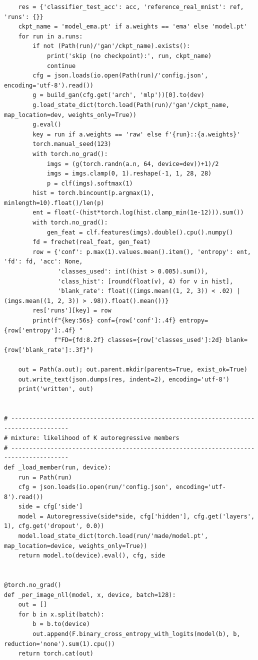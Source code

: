 \begin{lstlisting}
    res = {'classifier_test_acc': acc, 'reference_real_mnist': ref, 'runs': {}}
    ckpt_name = 'model_ema.pt' if a.weights == 'ema' else 'model.pt'
    for run in a.runs:
        if not (Path(run)/'gan'/ckpt_name).exists():
            print('skip (no checkpoint):', run, ckpt_name)
            continue
        cfg = json.loads(io.open(Path(run)/'config.json', encoding='utf-8').read())
        g = build_gan(cfg.get('arch', 'mlp'))[0].to(dev)
        g.load_state_dict(torch.load(Path(run)/'gan'/ckpt_name, map_location=dev, weights_only=True))
        g.eval()
        key = run if a.weights == 'raw' else f'{run}::{a.weights}'
        torch.manual_seed(123)
        with torch.no_grad():
            imgs = (g(torch.randn(a.n, 64, device=dev))+1)/2
            imgs = imgs.clamp(0, 1).reshape(-1, 1, 28, 28)
            p = clf(imgs).softmax(1)
        hist = torch.bincount(p.argmax(1), minlength=10).float()/len(p)
        ent = float(-(hist*torch.log(hist.clamp_min(1e-12))).sum())
        with torch.no_grad():
            gen_feat = clf.features(imgs).double().cpu().numpy()
        fd = frechet(real_feat, gen_feat)
        row = {'conf': p.max(1).values.mean().item(), 'entropy': ent, 'fd': fd, 'acc': None,
               'classes_used': int((hist > 0.005).sum()),
               'class_hist': [round(float(v), 4) for v in hist],
               'blank_rate': float(((imgs.mean((1, 2, 3)) < .02) | (imgs.mean((1, 2, 3)) > .98)).float().mean())}
        res['runs'][key] = row
        print(f"{key:56s} conf={row['conf']:.4f} entropy={row['entropy']:.4f} "
              f"FD={fd:8.2f} classes={row['classes_used']:2d} blank={row['blank_rate']:.3f}")

    out = Path(a.out); out.parent.mkdir(parents=True, exist_ok=True)
    out.write_text(json.dumps(res, indent=2), encoding='utf-8')
    print('written', out)


# --------------------------------------------------------------------------------------
# mixture: likelihood of K autoregressive members
# --------------------------------------------------------------------------------------
def _load_member(run, device):
    run = Path(run)
    cfg = json.loads(io.open(run/'config.json', encoding='utf-8').read())
    side = cfg['side']
    model = Autoregressive(side*side, cfg['hidden'], cfg.get('layers', 1), cfg.get('dropout', 0.0))
    model.load_state_dict(torch.load(run/'made/model.pt', map_location=device, weights_only=True))
    return model.to(device).eval(), cfg, side


@torch.no_grad()
def _per_image_nll(model, x, device, batch=128):
    out = []
    for b in x.split(batch):
        b = b.to(device)
        out.append(F.binary_cross_entropy_with_logits(model(b), b, reduction='none').sum(1).cpu())
    return torch.cat(out)



\end{lstlisting}
